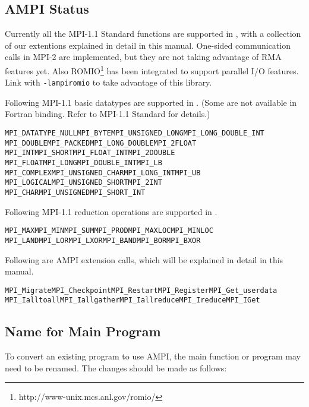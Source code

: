 \documentclass[10pt]{article}
\begin{document}
\subsection{AMPI Status}

Currently all the MPI-1.1 Standard functions are supported in \ampi{}, with a
collection of our extentions explained in detail in this manual. One-sided
communication calls in MPI-2 are implemented, but they are not taking advantage
of RMA features yet. Also ROMIO\footnote{http://www-unix.mcs.anl.gov/romio/} 
has been integrated to support parallel I/O features. Link with {\tt -lampiromio}
to take advantage of this library.

Following MPI-1.1 basic datatypes are supported in \ampi{}. (Some are not 
available in Fortran binding. Refer to MPI-1.1 Standard for details.)
\begin{alltt}
MPI_DATATYPE_NULL  MPI_BYTE            MPI_UNSIGNED_LONG MPI_LONG_DOUBLE_INT
MPI_DOUBLE         MPI_PACKED          MPI_LONG_DOUBLE   MPI_2FLOAT
MPI_INT            MPI_SHORT           MPI_FLOAT_INT     MPI_2DOUBLE
MPI_FLOAT          MPI_LONG            MPI_DOUBLE_INT    MPI_LB
MPI_COMPLEX        MPI_UNSIGNED_CHAR   MPI_LONG_INT      MPI_UB
MPI_LOGICAL        MPI_UNSIGNED_SHORT  MPI_2INT
MPI_CHAR           MPI_UNSIGNED        MPI_SHORT_INT
\end{alltt}

Following MPI-1.1 reduction operations are supported in \ampi{}.

\begin{alltt}
MPI_MAX   MPI_MIN   MPI_SUM   MPI_PROD  MPI_MAXLOC  MPI_MINLOC
MPI_LAND  MPI_LOR   MPI_LXOR  MPI_BAND  MPI_BOR     MPI_BXOR
\end{alltt}

Following are AMPI extension calls, which will be explained in detail in this
manual.
\begin{alltt}
MPI_Migrate     MPI_Checkpoint  MPI_Restart     MPI_Register    MPI_Get_userdata
MPI_Ialltoall   MPI_Iallgather  MPI_Iallreduce  MPI_Ireduce     MPI_IGet
\end{alltt}


\subsection{Name for Main Program}

To convert an existing program to use AMPI, the main function or program may need to be renamed. The changes should be made as follows:
\end{document}
